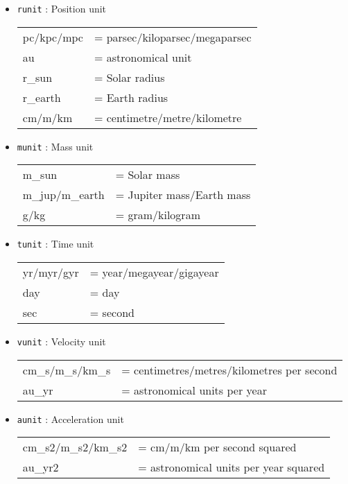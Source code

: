 \documentclass[a4paper]{article}
\newcommand{\var}[1]{\texttt{#1}}
\begin{document}
\begin{itemize}

\item \var{runit} : Position unit \vspace{0.1cm} \\
\begin{tabular}{ll}
pc/kpc/mpc & = parsec/kiloparsec/megaparsec \\
au         & = astronomical unit \\
r\_sun     & = Solar radius \\
r\_earth   & = Earth radius \\
cm/m/km    & = centimetre/metre/kilometre
\end{tabular}

\item \var{munit} : Mass unit \vspace{0.1cm} \\
\begin{tabular}{ll}
m\_sun          & = Solar mass \\
m\_jup/m\_earth & = Jupiter mass/Earth mass \\
g/kg            & = gram/kilogram
\end{tabular}


\item \var{tunit} : Time unit \\
\begin{tabular}{ll}
yr/myr/gyr & = year/megayear/gigayear \\
day        & = day \\
sec        & = second
\end{tabular}

\item \var{vunit} : Velocity unit \\
\begin{tabular}{ll}
cm\_s/m\_s/km\_s & = centimetres/metres/kilometres per second \\
au\_yr           & = astronomical units per year
\end{tabular}

\item \var{aunit} : Acceleration unit \\
\begin{tabular}{ll}
cm\_s2/m\_s2/km\_s2 & = cm/m/km per second squared \\
au\_yr2             & = astronomical units per year squared
\end{tabular}


\end{itemize}
\end{document}
